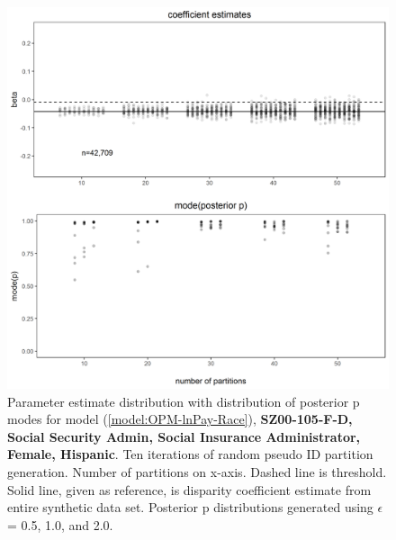 \documentclass[10pt, letterpaper]{article}
\begin{document}
\begin{spacing}{1.0}
\clearpage

\begin{figure}[h!]
    \centering
    \includegraphics[width=5in]{images/RacePayDifferentialBetaWithPosteriorDistribution-SZ00-105-F-D.png}
    \caption{Parameter estimate distribution with distribution of posterior p modes for model (\ref{model:OPM-lnPay-Race}), \textbf{SZ00-105-F-D, Social Security Admin, Social Insurance Administrator, Female, Hispanic}.  Ten iterations of random pseudo ID partition generation.  Number of partitions on x-axis.  Dashed line is threshold.  Solid line, given as reference, is disparity coefficient estimate from entire synthetic data set.  Posterior p distributions generated using $\epsilon$ = 0.5, 1.0, and 2.0.}
    \label{figure:RacePayDifferentialBetaWithPosteriorDistribution-SZ00-105-F-D}
\end{figure}

\clearpage


\end{spacing}
\end{document}
